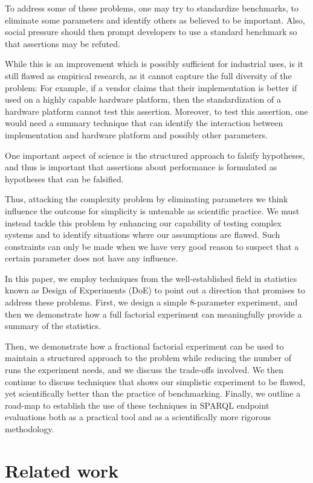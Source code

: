 \documentclass{llncs}
\begin{document}
To address some of these problems, one may try to standardize
benchmarks, to eliminate some parameters and identify others as
believed to be important. Also, social pressure should then prompt
developers to use a standard benchmark so that assertions may be
refuted.

While this is an improvement which is possibly sufficient for
industrial uses, is it still flawed as empirical
research, as it cannot capture the full diversity of the problem: For
example, if a vendor claims that their implementation is better if
used on a highly capable hardware platform, then the standardization
of a hardware platform cannot test this assertion. Moreover, to test
this assertion, one would need a summary technique that can identify
the interaction between implementation and hardware platform and
possibly other parameters.

One important aspect of science is the structured approach to falsify
hypotheses, and thus is important that assertions about performance is
formulated as hypotheses that can be falsified.

Thus, attacking the complexity problem by eliminating parameters we
think influence the outcome for simplicity is untenable as
scientific practice. We must instead tackle this problem by enhancing
our capability of testing complex systems and to identify situations
where our assumptions are flawed. Such constraints can only be made
when we have very good reason to suspect that a certain parameter does
not have any influence.

In this paper, we employ techniques from the well-established field in
statistics known as Design of Experiments (DoE) to point out a
direction that promises to address these problems. First, we design a
simple 8-parameter experiment, and then we demonstrate how a full
factorial experiment can meaningfully provide a summary of the
statistics.

Then, we demonstrate how a fractional factorial experiment can be used
to maintain a structured approach to the problem while reducing the
number of runs the experiment needs, and we discuss the trade-offs
involved. We then continue to discuss techniques that shows our
simplistic experiment to be flawed, yet scientifically better than the
practice of benchmarking. Finally, we outline a road-map to establish
the use of these techniques in SPARQL endpoint evaluations both as a
practical tool and as a scientifically more rigorous methodology.

\section{Related work}
\end{document}
